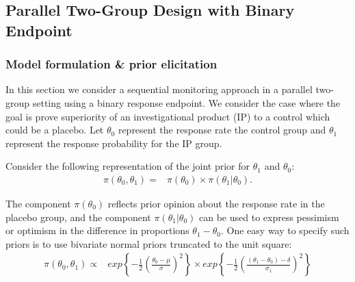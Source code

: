 \documentclass[12pt]{article}
\begin{document}
\subsection{Parallel Two-Group Design with Binary Endpoint}
\subsubsection{Model formulation \& prior elicitation}
In this section we consider a sequential monitoring approach in a parallel two-group setting using a binary response endpoint. We consider the case where the goal is prove superiority of an investigational product (IP) to a control which could be a placebo. Let $\theta_0$ represent the response rate the control group and $\theta_1$ represent the response probability for the IP group. 

Consider the following representation of the joint prior for $\theta_1$ and $\theta_0$:
\begin{align*}
\pi(\theta_0,\theta_1)=&\pi(\theta_0)\times\pi(\theta_1|\theta_0).
\end{align*} 

The component $\pi(\theta_0)$ reflects prior opinion about the response rate in the placebo group, and the component $\pi(\theta_1|\theta_0)$ can be used to express pessimism or optimism in the difference in proportions $\theta_1 - \theta_0$. One easy way to specify such priors is to use bivariate normal priors truncated to the unit square:
\begin{align*}
\pi(\theta_0,\theta_1)\propto&exp\left\{-\frac{1}{2}\left(\frac{\theta_0-\mu}{\sigma}\right)^{2}\right\}\times exp\left\{-\frac{1}{2}\left(\frac{(\theta_1-\theta_0)-\delta}{\sigma_1}\right)^{2}\right\}
\end{align*}
\end{document}
